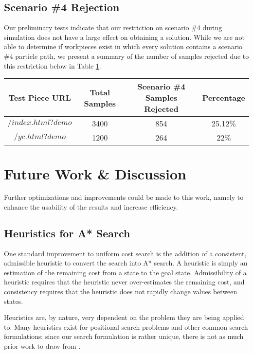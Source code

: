   \subsection{Scenario \#4 Rejection}

Our preliminary tests indicate that our restriction on scenario \#4 during simulation does not have a large effect on obtaining a solution. While we are not able to determine if workpieces exist in which every solution contains a scenario \#4 particle path, we present a summary of the number of samples rejected due to this restriction below in Table \ref{scenario4rejects}.


\begin{table}[H]\label{scenario4rejects}
\begin{tabular}{|c|c|c|c|}
\hline
Test Piece URL & Total Samples & Scenario \#4 Samples Rejected & Percentage \\ \hline
$/index.html?demo$ & 3400 & 854 & 25.12\%\\
$/yc.html?demo$ & 1200 & 264 & 22\% \\
\end{tabular}
\end{table}

\section{Future Work \& Discussion}

Further optimizations and improvements could be made to this work, namely to enhance the usability of the results and increase efficiency.

  \subsection{Heuristics for A* Search}

One standard improvement to uniform cost search is the addition of a consistent, admissible heuristic to convert the search into A* search. A heuristic is simply an estimation of the remaining cost from a state to the goal state. Admissibility of a heuristic requires that the heuristic never over-estimates the remaining cost, and consistency requires that the heuristic does not rapidly change values between states.

Heuristics are, by nature, very dependent on the problem they are being applied to. Many heuristics exist for positional search problems and other common search formulations; since our search formulation is rather unique, there is not as much prior work to draw from \cite{christofides1976worst}.

